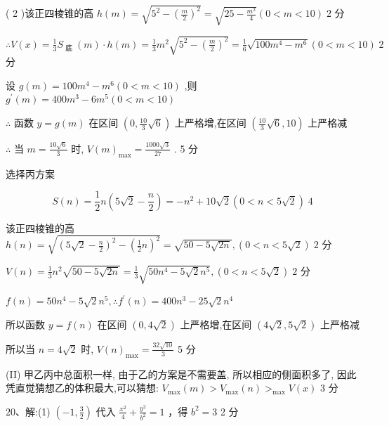 \documentclass[10pt]{article}
\begin{document}
( 2 )该正四棱锥的高 \(h\left( m\right)  = \sqrt{{5}^{2} - {\left( \frac{m}{2}\right) }^{2}} = \sqrt{{25} - \frac{{m}^{2}}{4}}\left( {0 < m < {10}}\right) \;2\) 分

\(\therefore V\left( x\right)  = \frac{1}{3}{S}_{\text{ 底 }}\left( m\right)  \cdot  h\left( m\right)  = \frac{1}{3}{m}^{2}\sqrt{{5}^{2} - {\left( \frac{m}{2}\right) }^{2}} = \frac{1}{6}\sqrt{{100}{m}^{4} - {m}^{6}}\left( {0 < m < {10}}\right) \;2\) 分

设 \(g\left( m\right)  = {100}{m}^{4} - {m}^{6}\left( {0 < m < {10}}\right)\) ,则 \({g}^{\prime }\left( m\right)  = {400}{m}^{3} - 6{m}^{5}\left( {0 < m < {10}}\right)\)

\(\therefore\) 函数 \(y = g\left( m\right)\) 在区间 \(\left( {0,\frac{10}{3}\sqrt{6}}\right)\) 上严格增,在区间 \(\left( {\frac{10}{3}\sqrt{6},{10}}\right)\) 上严格减

\(\therefore\) 当 \(m = \frac{{10}\sqrt{6}}{3}\) 时, \(V{\left( m\right) }_{\max } = \frac{{1000}\sqrt{3}}{27}\) . 5 分

选择丙方案

\[
S\left( n\right)  = \frac{1}{2}n\left( {5\sqrt{2} - \frac{n}{2}}\right)  =  - {n}^{2} + {10}\sqrt{2}\left( {0 < n < 5\sqrt{2}}\right) \;4
\]

该正四棱锥的高 \(h\left( n\right)  = \sqrt{{\left( 5\sqrt{2} - \frac{n}{2}\right) }^{2} - {\left( \frac{1}{2}n\right) }^{2}} = \sqrt{{50} - 5\sqrt{2n}},\left( {0 < n < 5\sqrt{2}}\right) \;2\) 分

\(V\left( n\right)  = \frac{1}{3}{n}^{2}\sqrt{{50} - 5\sqrt{2n}} = \frac{1}{3}\sqrt{{50}{n}^{4} - 5\sqrt{2}{n}^{5}},\left( {0 < n < 5\sqrt{2}}\right) \;2\) 分

\(f\left( n\right)  = {50}{n}^{4} - 5\sqrt{2}{n}^{5},\therefore {f}^{\prime }\left( n\right)  = {400}{n}^{3} - {25}\sqrt{2}{n}^{4}\)

所以函数 \(y = f\left( n\right)\) 在区间 \(\left( {0,4\sqrt{2}}\right)\) 上严格增,在区间 \(\left( {4\sqrt{2},5\sqrt{2}}\right)\) 上严格减

所以当 \(n = 4\sqrt{2}\) 时, \(V{\left( n\right) }_{\max } = \frac{{32}\sqrt{10}}{3}\) 5 分

(II) 甲乙丙中总面积一样, 由于乙的方案是不需要盖, 所以相应的侧面积多了, 因此凭直觉猜想乙的体积最大,可以猜想: \({V}_{\max }\left( m\right)  > {V}_{\max }\left( n\right) { > }_{\max }V\left( x\right)\) 3 分

20、解:(1) \(\left( {-1,\frac{3}{2}}\right)\) 代入 \(\frac{{x}^{2}}{4} + \frac{{y}^{2}}{{b}^{2}} = 1\) ，得 \({b}^{2} = 3\) 2 分
\end{document}
